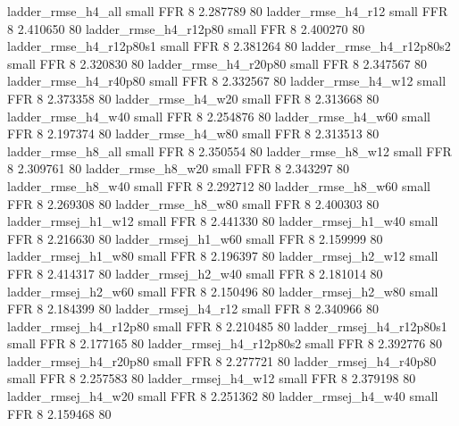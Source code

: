       ladder_rmse_h4_all      small      FFR                 8 2.287789 80
      ladder_rmse_h4_r12      small      FFR                 8 2.410650 80
   ladder_rmse_h4_r12p80      small      FFR                 8 2.400270 80
 ladder_rmse_h4_r12p80s1      small      FFR                 8 2.381264 80
 ladder_rmse_h4_r12p80s2      small      FFR                 8 2.320830 80
   ladder_rmse_h4_r20p80      small      FFR                 8 2.347567 80
   ladder_rmse_h4_r40p80      small      FFR                 8 2.332567 80
      ladder_rmse_h4_w12      small      FFR                 8 2.373358 80
      ladder_rmse_h4_w20      small      FFR                 8 2.313668 80
      ladder_rmse_h4_w40      small      FFR                 8 2.254876 80
      ladder_rmse_h4_w60      small      FFR                 8 2.197374 80
      ladder_rmse_h4_w80      small      FFR                 8 2.313513 80
      ladder_rmse_h8_all      small      FFR                 8 2.350554 80
      ladder_rmse_h8_w12      small      FFR                 8 2.309761 80
      ladder_rmse_h8_w20      small      FFR                 8 2.343297 80
      ladder_rmse_h8_w40      small      FFR                 8 2.292712 80
      ladder_rmse_h8_w60      small      FFR                 8 2.269308 80
      ladder_rmse_h8_w80      small      FFR                 8 2.400303 80
     ladder_rmsej_h1_w12      small      FFR                 8 2.441330 80
     ladder_rmsej_h1_w40      small      FFR                 8 2.216630 80
     ladder_rmsej_h1_w60      small      FFR                 8 2.159999 80
     ladder_rmsej_h1_w80      small      FFR                 8 2.196397 80
     ladder_rmsej_h2_w12      small      FFR                 8 2.414317 80
     ladder_rmsej_h2_w40      small      FFR                 8 2.181014 80
     ladder_rmsej_h2_w60      small      FFR                 8 2.150496 80
     ladder_rmsej_h2_w80      small      FFR                 8 2.184399 80
     ladder_rmsej_h4_r12      small      FFR                 8 2.340966 80
  ladder_rmsej_h4_r12p80      small      FFR                 8 2.210485 80
ladder_rmsej_h4_r12p80s1      small      FFR                 8 2.177165 80
ladder_rmsej_h4_r12p80s2      small      FFR                 8 2.392776 80
  ladder_rmsej_h4_r20p80      small      FFR                 8 2.277721 80
  ladder_rmsej_h4_r40p80      small      FFR                 8 2.257583 80
     ladder_rmsej_h4_w12      small      FFR                 8 2.379198 80
     ladder_rmsej_h4_w20      small      FFR                 8 2.251362 80
     ladder_rmsej_h4_w40      small      FFR                 8 2.159468 80
